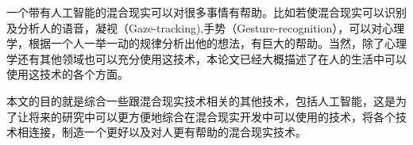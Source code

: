 \documentclass{llncs}
\begin{document}
一个带有人工智能的混合现实可以对很多事情有帮助。比如若使混合现实可以识别及分析人的语音，凝视（Gaze-tracking),手势（Gesture-recognition），可以对心理学，根据一个人一举一动的规律分析出他的想法，有巨大的帮助。当然，除了心理学还有其他领域也可以充分使用这技术，本论文已经大概描述了在人的生活中可以使用这技术的各个方面。

本文的目的就是综合一些跟混合现实技术相关的其他技术，包括人工智能，这是为了让将来的研究中可以更方便地综合在混合现实开发中可以使用的技术，将各个技术相连接，制造一个更好以及对人更有帮助的混合现实技术。

\

%

	
\end{document}
